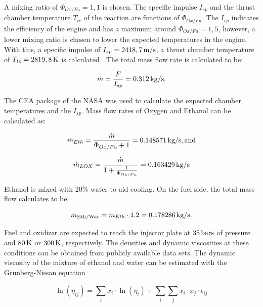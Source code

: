         A mixing ratio of $\Phi_{Ox/Fu} = 1,1$ is chosen. The specific impulse $I_{sp}$ and the thrust chamber temperature $T_{tc}$ of the reaction are functions of $\Phi_{Ox/Fu}$. The $I_{sp}$ indicates the efficiency of the engine and has a maximum around $\Phi_{Ox/Fu} = 1,5$, however, a lower mixing ratio is chosen to lower the expected temperatures in the engine. With this, a specific impulse of $I_{sp} = 2418,7 \,\text{m/s}$, a thrust chamber temperature of $T_{tc} = 2819,8\,\text{K}$ is calculated \cite[p.\,21]{mayer:2023}. The total mass flow rate is calculated to be:

        \begin{equation}
            \dot{m} = \frac{F}{I_{sp}} = 0.312 \,\text{kg/s}.
        \end{equation}

        The \ac{CEA} package of the \ac{NASA} was used to calculate the expected chamber temperatures and the $I_{sp}$. Mass flow rates of Oxygen and Ethanol can be calculated as:

        \begin{equation}
            \dot{m}_{Eth} = \frac{\dot{m}}{\Phi_{Ox/Fu}+1} = 0.148571\,\text{kg/s}, \text{and}
        \end{equation}

        \begin{equation}
            \dot{m}_{LOX} = \frac{\dot{m}}{1+\frac{1}{\Phi_{Ox/Fu}}} = 0.163429\,\text{kg/s}
        \end{equation}

        Ethanol is mixed with 20\% water to aid cooling. On the fuel side, the total mass flow calculates to be:

        \begin{equation}
            \dot{m}_{\text{Eth/Wat}} = \dot{m}_{Eth} \cdot 1.2 = 0.178286 \,\text{kg/s}.
        \end{equation}

        Fuel and oxidizer are expected to reach the injector plate at $35 \,\text{bars}$ of pressure and $80 \,\text{K}$ or $300 \,\text{K}$, respectively. The densities and dynamic viscosities at these conditions can be obtained from publicly available data sets. The dynamic viscosity of the mixture of ethanol and water can be estimated with the Grunberg-Nissan equation

        \begin{equation}
            \ln{(\eta_{ij})} = \sum_i x_i \cdot \ln{(\eta_i)} + \sum_i \sum_j x_i \cdot x_j \cdot \epsilon_{ij}
        \end{equation}

